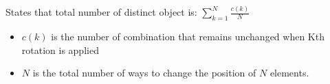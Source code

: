 States that total number of distinct object is: $\sum_{k=1}^{N} \frac{c(k)}{N}$
\begin{itemize}
    \item $c(k)$ is the number of combination that remains unchanged when Kth rotation is applied
    \item $N$ is the total number of ways to change the position of $N$ elements.
\end{itemize}